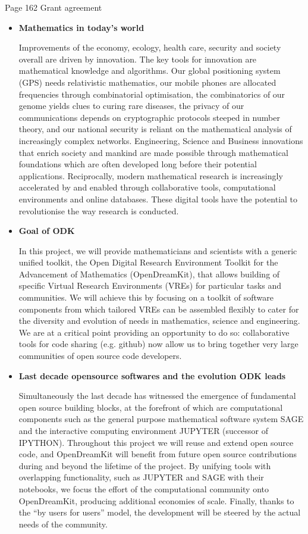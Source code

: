 \documentclass[12pt]{amsbook}
\begin{document}
Page 162 Grant agreement
\begin{itemize}

\item{\textbf{Mathematics in today's world}}

Improvements of the economy, ecology, health care, security and society overall are driven by innovation. The key tools for
innovation are mathematical knowledge and algorithms. Our global positioning system (GPS) needs relativistic mathematics,
our mobile phones are allocated frequencies through combinatorial optimisation, the combinatorics of our genome yields clues
to curing rare diseases, the privacy of our communications depends on cryptographic protocols steeped in number theory,
and our national security is reliant on the mathematical analysis of increasingly complex networks. Engineering, Science and
Business innovations that enrich society and mankind are made possible through mathematical foundations which are often
developed long before their potential applications. Reciprocally, modern mathematical research is increasingly accelerated
by and enabled through collaborative tools, computational environments and online databases. These digital tools have the
potential to revolutionise the way research is conducted.

\item{\textbf{Goal of ODK}}

In this project, we will provide mathematicians and scientists with a generic unified toolkit, the Open Digital Research
Environment Toolkit for the Advancement of Mathematics (OpenDreamKit), that allows building of specific Virtual Research
Environments (VREs) for particular tasks and communities.
We will achieve this by focusing on a toolkit of software components from which tailored VREs can be assembled flexibly to
cater for the diversity and evolution of needs in mathematics, science and engineering. We are at a critical point providing an
opportunity to do so: collaborative tools for code sharing (e.g. github) now allow us to bring together very large communities
of open source code developers.

\item{\textbf{Last decade opensource softwares and the evolution ODK leads}}

Simultaneously the last decade has witnessed the emergence of fundamental open source building blocks, at the forefront
of which are computational components such as the general purpose mathematical software system SAGE and the interactive
computing environment JUPYTER (successor of IPYTHON). Throughout this project we will reuse and extend open source
code, and OpenDreamKit will benefit from future open source contributions during and beyond the lifetime of the project.
By unifying tools with overlapping functionality, such as JUPYTER and SAGE with their notebooks, we focus the effort of the
computational community onto OpenDreamKit, producing additional economies of scale. Finally, thanks to the “by users for
users” model, the development will be steered by the actual needs of the community.


\end{itemize}
\end{document}
